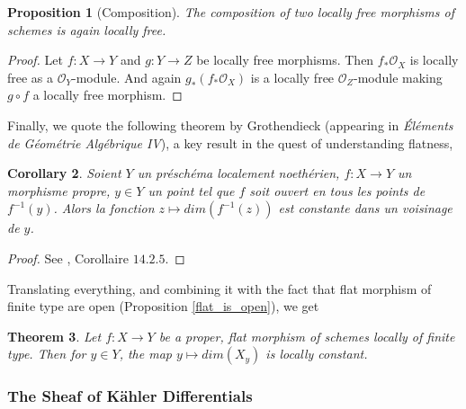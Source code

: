 \documentclass{article}
\theoremstyle{plain}
\newtheorem{theorem}{Theorem}[subsection]
\newtheorem{proposition}[theorem]{Proposition}
\newtheorem{corollary}[theorem]{Corollary}
\theoremstyle{definition}
\begin{document}
\begin{proposition}[Composition]
    The composition of two locally free morphisms of schemes is again locally free.
\end{proposition}
\begin{proof}
    Let $f:X\rightarrow Y$ and $g:Y\rightarrow Z$ be locally free morphisms.
    Then $f_*\mathcal{O}_X$ is locally free as a $\mathcal{O}_Y$-module.
    And again $g_*(f_*\mathcal{O}_X)$ is a locally free $\mathcal{O}_Z$-module making $g\circ f$ a locally free morphism.
\end{proof}



\noindent Finally, we quote the following theorem by Grothendieck (appearing in  \textit{\'El\'ements de G\'eom\'etrie Alg\'ebrique IV}), a key result in the quest of understanding flatness,
\begin{corollary}
    Soient $Y$ un pr\'esch\'ema localement noeth\'erien, $f:X\rightarrow Y$ un morphisme propre, $y\in Y$ un point tel que $f$ soit ouvert en tous les points de $f^{-1}(y)$. 
    Alors la fonction $z\mapsto dim(f^{-1}(z))$ est constante dans un voisinage de $y$.
\end{corollary}
\begin{proof}
    See \cite{EGA}, Corollaire $14.2.5$.
\end{proof}


\noindent Translating everything, and combining it with the fact that flat morphism of finite type are open (Proposition \ref{flat_is_open}), we get 

\begin{theorem}
    Let $f:X\rightarrow Y$ be a proper, flat morphism of schemes locally of finite type. Then for $y\in Y$, the map $y\mapsto dim(X_y)$ is locally constant.
\end{theorem}






\subsubsection{The Sheaf of K\"ahler Differentials}
\end{document}
